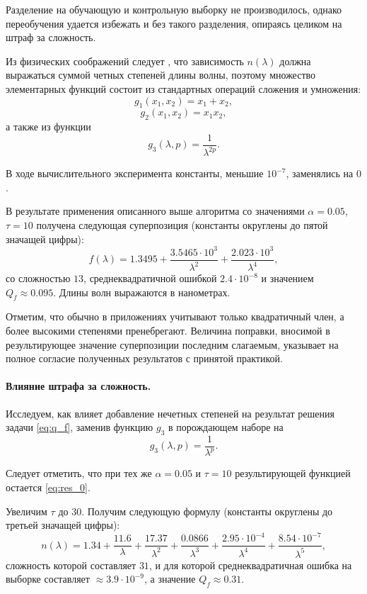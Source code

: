 \documentclass[12pt,a4paper]{article}
\begin{document}
Разделение на обучающую и контрольную выборку не производилось, однако переобучения
удается избежать и без такого разделения, опираясь целиком на штраф за сложность.

Из физических соображений следует \cite{Serova11}, что зависимость $n(\lambda)$
должна выражаться суммой
четных степеней длины волны, поэтому множество элементарных функций состоит из
стандартных операций сложения и умножения:
\[
  g_1(x_1, x_2) = x_1 + x_2,
\]
\[
  g_2(x_1, x_2) = x_1 x_2,
\]
а также из функции
\[
  g_3(\lambda, p) = \frac{1}{\lambda^{2p}}.
\]

В ходе вычислительного эксперимента константы, меньшие $10^{-7}$,
заменялись на $0$.

В результате применения описанного выше алгоритма со значениями
$\alpha = 0.05$, $\tau = 10$ получена следующая суперпозиция
(константы округлены до пятой значащей цифры):
\begin{equation}
  f(\lambda) = 1.3495 + \frac{3.5465 \cdot 10^3}{\lambda^2} + \frac{2.023 \cdot 10^3}{\lambda^4},
  \label{eq:res_0}
\end{equation}
со сложностью $13$, среднеквадратичной ошибкой $2.4 \cdot 10^{-8}$ и значением $Q_f \approx 0.095$.
Длины волн выражаются в нанометрах.

Отметим, что обычно в приложениях учитывают только квадратичный член, а более
высокими степенями пренебрегают. Величина поправки, вносимой в результирующее значение
суперпозиции последним слагаемым, указывает на полное согласие полученных результатов
с принятой практикой.

\paragraph{Влияние штрафа за сложность.}

Исследуем, как влияет добавление нечетных степеней на результат решения задачи \eqref{eq:q_f},
заменив функцию $g_3$ в порождающем наборе на
\[
  g_3(\lambda, p) = \frac{1}{\lambda^p}.
\]

Следует отметить, что при тех же $\alpha = 0.05$ и $\tau = 10$ результирующей функцией остается
\eqref{eq:res_0}.

Увеличим $\tau$ до 30. Получим следующую формулу (константы округлены до третьей значащей цифры):
\begin{equation}
  n(\lambda) = 1.34 + \frac{11.6}{\lambda} + \frac{17.37}{\lambda^2} + \frac{0.0866}{\lambda^3} + \frac{2.95 \cdot 10^{-4}}{\lambda^4} + \frac{8.54 \cdot 10^{-7}}{\lambda^5},
  \label{eq:res_incorrect}
\end{equation}
сложность которой составляет $31$, и для которой среднеквадратичная ошибка
на выборке составляет $\approx 3.9 \cdot 10^{-9}$,
а значение $Q_f \approx 0.31$.
\end{document}

